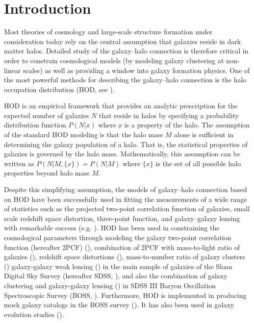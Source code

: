 \documentclass[12pt, preprint]{aastex}
\begin{document}
\section{Introduction}

Most theories of cosmology and large-scale structure formation under consideration today rely on the central assumption that galaxies reside in dark matter halos. Detailed study of the galaxy--halo connection is therefore critical in order to constrain cosmological models (by modeling galaxy clustering at non-linear scales) as well as providing a window into galaxy formation physics. One of the most powerful methods for describing the galaxy--halo connection is the halo occupation 
distribution (HOD, see \citealt{seljak2000, berlind_weinberg2002, scoccimarro2001, zheng2005, zheng07, leauthaud12, tinker2013, decorated, 2016arXiv160701782H}).

HOD is an empirical framework that provides an analytic prescription for the expected number of galaxies $N$ that reside in halos by specifying a probability distribution function $P(N|x)$ where $x$ is a property of the halo. The assumption of the standard HOD modeling is that the halo mass $M$ alone is sufficient in determining the galaxy population of a halo. That is, the statistical properties of galaxies is governed by the halo mass. Mathematically, this assumption can be written as $P(N|M,\{x\})=P(N|M)$ where $\{x\}$ is the set of all possible halo properties beyond halo mass $M$.

Despite this simplifying assumption, the models of galaxy--halo connection based on HOD have been successfully used in fitting the measurements of a wide range of statistics such as the projected two-point correlation function of galaxies, small scale redshift space distortion, three-point function, and galaxy--galaxy lensing with remarkable success (e.g. \citealt{zheng07,tinker_rsd2007,zehavi2011,leauthaud12,parejko2013,coupon2015,hod-3pcf,guo2015,miyatake15,zu2015,hod_vs_sham}). 
HOD has been used in constraining the cosmological parameters through modeling the galaxy two-point correlation function (hereafter 2PCF) (\citealt{abazajian2005}), combination of 2PCF with mass-to-light ratio of galaxies (\citealt{tinker05}), redshift space distortions (\citealt{tinker_rsd2007}), mass-to-number ratio of galaxy clusters (\citealt{tinker2012}) galaxy-galaxy weak lensing (\citealt{vdb03,cacciato13,more13,vdb13}) in the main sample of galaxies
of the Sloan Digital Sky Survey (hereafter SDSS, \citealt{york2000}), and also the combination of galaxy clustering and galaxy-galaxy lensing (\citealt{more15}) in SDSS III Baryon Oscillation Spectroscopic Survey (BOSS, \citealt{boss}). Furthermore, HOD is implemented in producing mock galaxy catalogs in the BOSS survey (\citealt{manera2013,white2014}). It has also been used in galaxy evolution studies (\citealt{conroy2009,leauthaud12,behroozi13,hudson2015,zu2015,zu2016}).
\end{document}
